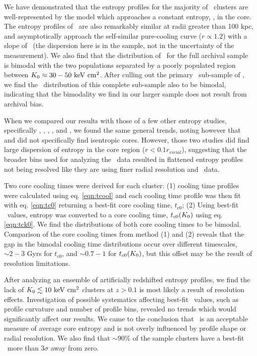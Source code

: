 \documentclass[12pt,preprint]{aastex}
\begin{document}
We have demonstrated that the entropy profiles for the majority of
\accept\ clusters are well-represented by the model which approaches a
constant entropy, \kna, in the core. The entropy profiles of
\accept\ are also remarkably similar at radii greater than 100 kpc,
and asymptotically approach the self-similar pure-cooling curve ($r
\propto 1.2$) with a slope of \alphafs\ (the dispersion here is in the
sample, not in the uncertainty of the measurement). We also find that
the distribution of \kna\ for the full archival sample is bimodal with
the two populations separated by a poorly populated region between
$K_0 \approx 30-50 \mathrm{\mbox{\ensuremath{\mathrm{~keV}}} \mathrm{\mbox{\ensuremath{\mathrm{~cm}}}^2}}$. After culling out the primary
\hifl\ sub-sample of \citet{hiflugcs1}, we find the \kna\ distribution
of this complete sub-sample also to be bimodal, indicating that the
bimodality we find in our larger sample does not result from archival
bias.

When we compared our results with those of a few other entropy
studies, specifically \citet{davies00}, \citet{ponman03},
\citet{piffaretti05}, \citet{pratt06}, and \citet{morandi07}, we found
the same general trends, noting however that \citet{piffaretti05} and
\citet{pratt06} did not specifically find isentropic cores. However,
those two studies did find large dispersion of entropy in the core
region ($r < 0.1 r_{virial}$), suggesting that the broader bins used
for analyzing the \xmm\ data resulted in flattened entropy profiles
not being resolved like they are using finer radial resolution and
\chandra\ data.

Two core cooling times were derived for each cluster: (1) cooling time
profiles were calculated using eq. \ref{eqn:tcool} and each cooling
time profile was then fit with eq. \ref{eqn:tc0} returning a best-fit
core cooling time, $t_{c0}$; (2) Using best-fit \kna\ values, entropy
was converted to a core cooling time, $t_{c0}(K_0)$ using
eq. \ref{eqn:tck0}. We find the distributions of both core cooling
times to be bimodal. Comparison of the core cooling times from method
(1) and (2) reveals that the gap in the bimodal cooling time
distributions occur over different timescales, $\sim 2-3$ Gyrs for
$t_{c0}$, and $\sim 0.7-1$ for $t_{c0}(K_0)$, but this offset may be
the result of resolution limitations.

After analyzing an ensemble of artificially redshifted entropy
profiles, we find the lack of $K_0 \lesssim 10 \mathrm{\mbox{\ensuremath{\mathrm{~keV}}} \mathrm{\mbox{\ensuremath{\mathrm{~cm}}}^2}}$ clusters at $z > 0.1$
is most likely a result of resolution effects. Investigation of
possible systematics affecting best-fit \kna\ values, such as profile
curvature and number of profile bins, revealed no trends which would
significantly affect our results. We came to the conclusion that
\kna\ is an acceptable measure of average core entropy and is not
overly influenced by profile shape or radial resolution. We also find
that $\sim90\%$ of the sample clusters have a best-fit \kna\ more than
$3\sigma$ away from zero.
\end{document}
